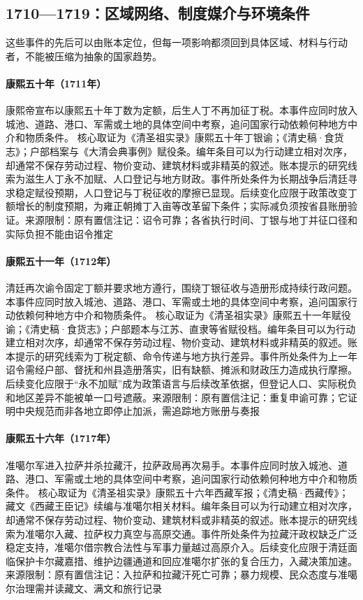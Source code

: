 \subsection{1710—1719：区域网络、制度媒介与环境条件}
这些事件的先后可以由账本定位，但每一项影响都须回到具体区域、材料与行动者，不能被压缩为抽象的国家趋势。
\hypertarget{civic:EQ-1711-TAX-FREEZE}{}\paragraph{康熙五十年（1711年）}康熙帝宣布以康熙五十年丁数为定额，后生人丁不再加征丁税。本事件应同时放入城池、道路、港口、军需或土地的具体空间中考察，追问国家行动依赖何种地方中介和物质条件。 核心取证为《清圣祖实录》康熙五十年丁银谕；《清史稿·食货志》；户部档案与《大清会典事例》赋役条。编年条目可以为行动建立相对次序，却通常不保存劳动过程、物价变动、建筑材料或非精英的叙述。账本提示的研究线索为滋生人丁永不加赋、人口登记与地方财政。事件所处条件为长期战争后清廷寻求稳定赋役预期，人口登记与丁税征收的摩擦已显现。后续变化应限于政策改变丁额增长的制度预期，为雍正朝摊丁入亩等改革留下条件；实际减负须按省县账册验证。来源限制：原有置信注记：诏令可靠；各省执行时间、丁银与地丁并征口径和实际负担不能由诏令推定
\hypertarget{civic:EQ-1712-TAX-EDICT}{}\paragraph{康熙五十一年（1712年）}清廷再次谕令固定丁额并要求地方遵行，围绕丁银征收与造册形成持续行政问题。本事件应同时放入城池、道路、港口、军需或土地的具体空间中考察，追问国家行动依赖何种地方中介和物质条件。 核心取证为《清圣祖实录》康熙五十一年赋役谕；《清史稿·食货志》；户部题本与江苏、直隶等省赋役档。编年条目可以为行动建立相对次序，却通常不保存劳动过程、物价变动、建筑材料或非精英的叙述。账本提示的研究线索为丁税定额、命令传递与地方执行差异。事件所处条件为上一年诏令需经户部、督抚和州县造册落实，旧有缺额、摊派和财政压力造成执行摩擦。后续变化应限于“永不加赋”成为政策语言与后续改革依据，但登记人口、实际税负和地区差异不能被单一口号遮蔽。来源限制：原有置信注记：重复申谕可靠；它证明中央规范而非各地立即停止加派，需追踪地方账册与奏报
\hypertarget{civic:EQ-1717-DZUNGAR-LHASA}{}\paragraph{康熙五十六年（1717年）}准噶尔军进入拉萨并杀拉藏汗，拉萨政局再次易手。本事件应同时放入城池、道路、港口、军需或土地的具体空间中考察，追问国家行动依赖何种地方中介和物质条件。 核心取证为《清圣祖实录》康熙五十六年西藏军报；《清史稿·西藏传》；藏文《西藏王臣记》续编与准噶尔相关材料。编年条目可以为行动建立相对次序，却通常不保存劳动过程、物价变动、建筑材料或非精英的叙述。账本提示的研究线索为准噶尔入藏、拉萨权力真空与高原交通。事件所处条件为拉藏汗政权缺乏广泛稳定支持，准噶尔借宗教合法性与军事力量越过高原介入。后续变化应限于清廷面临保护卡尔藏嘉措、维护边疆通道和回应准噶尔扩张的复合压力，入藏决策加速。来源限制：原有置信注记：入拉萨和拉藏汗死亡可靠；暴力规模、民众态度与准噶尔治理需并读藏文、满文和旅行记录
